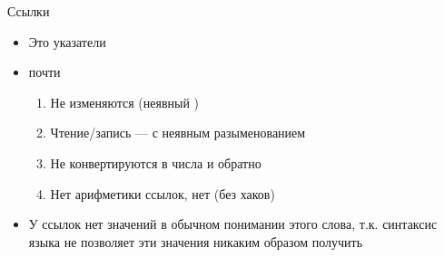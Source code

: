 \documentclass[aspectratio=169,14pt]{beamer}
\begin{document}
    \begin{frame}[fragile]{Ссылки}
        \begin{itemize}
            \item<2-> Это указатели
            \item<3-> почти
                \begin{enumerate}
                    \item<4-> Не изменяются (неявный )
                    \item<4-> Чтение/запись --- с неявным разыменованием
                    \item<4-> Не конвертируются в числа и обратно
                    \item<4-> Нет арифметики ссылок, нет  (без хаков)
                \end{enumerate}
            \item<5-> У ссылок нет значений в обычном понимании этого слова, т.к. синтаксис языка не позволяет эти значения никаким образом получить
        \end{itemize}
    \end{frame}
\end{document}
